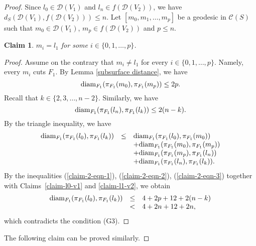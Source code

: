 \documentclass[]{aspm}
\newtheorem{claim}[definition]{Claim}
\begin{document}
\begin{proof}
Since $l_0\in \mathcal{D}(V_1)$ and $l_n\in f(\mathcal{D}(V_2))$, we have $d_{S} (\mathcal{D}(V_1), f(\mathcal{D}(V_2)))\leq n$.
Let $[m_0,m_1,\dots,m_p]$ be a geodesic in $\mathcal{C}(S)$ such that $m_0\in \mathcal{D}(V_1)$, $m_p\in f(\mathcal{D}(V_2))$ and $p\leq n$.

\begin{claim}\label{claim-2}
$m_i=l_1$ for some $i\in\{0,1,\dots,p\}$.
\end{claim}

\begin{proof}
Assume on the contrary that $m_i\neq l_1$ for every $i\in\{0,1,\dots,p\}$.
Namely, every $m_i$ cuts $F_1$.
By Lemma \ref{subsurface distance}, we have
\begin{equation}\label{claim-2-eqn-1}
{\rm diam}_{F_1}(\pi_{F_1}(m_0), \pi_{F_1}(m_p))\leq 2p.
\end{equation}
Recall that $k\in\{2,3,\dots,n-2\}$. 
Similarly, we have 
\begin{equation}\label{claim-2-eqn-2}
{\rm diam}_{F_1}(\pi_{F_1}(l_n), \pi_{F_1}(l_k))\leq 2(n-k).
\end{equation}
By the triangle inequality, we have
\begin{eqnarray}\label{claim-2-eqn-3}
\begin{array}{rcl}
{\rm diam}_{F_1}(\pi_{F_1}(l_0), \pi_{F_1}(l_k)) &\leq& {\rm diam}_{F_1}(\pi_{F_1}(l_0), \pi_{F_1}(m_0))
\\&&+{\rm diam}_{F_1}(\pi_{F_1}(m_0), \pi_{F_1}(m_p))
\\&&+{\rm diam}_{F_1}(\pi_{F_1}(m_p), \pi_{F_1}(l_n))
\\&&+{\rm diam}_{F_1}(\pi_{F_1}(l_n), \pi_{F_1}(l_k)).
\end{array}
\end{eqnarray}
By the inequalities (\ref{claim-2-eqn-1}), (\ref{claim-2-eqn-2}), (\ref{claim-2-eqn-3}) together with Claims~\ref{claim-l0-v1} and \ref{claim-l1-v2}, we obtain
\begin{eqnarray}\label{claim-2-eqn-4}
\begin{array}{rcl}
{\rm diam}_{F_1}(\pi_{F_1}(l_0), \pi_{F_1}(l_k)) &\leq& 4+2p+12+2(n-k)
\\&<& 4+2n+12+2n,
\end{array}
\end{eqnarray}
which contradicts the condition (G3).
\end{proof}

The following claim can be proved similarly.


\end{proof}
\end{document}

